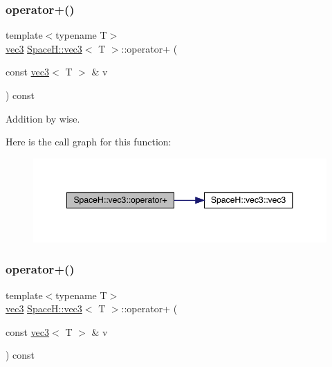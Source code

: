 \subsubsection{\texorpdfstring{operator+()}{operator+()}\hspace{0.1cm}{\footnotesize\ttfamily [1/7]}}
{\footnotesize\ttfamily template$<$typename T$>$ \\
\mbox{\hyperlink{struct_space_h_1_1vec3}{vec3}} \mbox{\hyperlink{struct_space_h_1_1vec3}{Space\+H\+::vec3}}$<$ T $>$\+::operator+ (\begin{DoxyParamCaption}\item[{const \mbox{\hyperlink{struct_space_h_1_1vec3}{vec3}}$<$ T $>$ \&}]{v }\end{DoxyParamCaption}) const\hspace{0.3cm}{\ttfamily [inline]}}



Addition by wise. 

Here is the call graph for this function\+:
\nopagebreak
\begin{figure}[H]
\begin{center}
\leavevmode
\includegraphics[width=348pt]{struct_space_h_1_1vec3_a439dd37afaf3c046cd58b370b9d70b80_cgraph}
\end{center}
\end{figure}
\mbox{\label{struct_space_h_1_1vec3_a439dd37afaf3c046cd58b370b9d70b80}} 
\subsubsection{\texorpdfstring{operator+()}{operator+()}\hspace{0.1cm}{\footnotesize\ttfamily [2/7]}}
{\footnotesize\ttfamily template$<$typename T$>$ \\
\mbox{\hyperlink{struct_space_h_1_1vec3}{vec3}} \mbox{\hyperlink{struct_space_h_1_1vec3}{Space\+H\+::vec3}}$<$ T $>$\+::operator+ (\begin{DoxyParamCaption}\item[{const \mbox{\hyperlink{struct_space_h_1_1vec3}{vec3}}$<$ T $>$ \&}]{v }\end{DoxyParamCaption}) const\hspace{0.3cm}{\ttfamily [inline]}}



